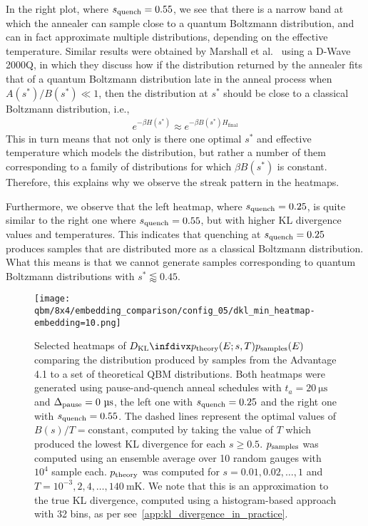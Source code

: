 In the right plot, where \( s_{\text{quench}} = 0.55 \), we see that there is a narrow band at which the annealer can sample close to a quantum Boltzmann distribution, and can in fact approximate multiple distributions, depending on the effective temperature.
Similar results were obtained by Marshall et al.~\cite{marshall_2019} using a D-Wave 2000Q, in which they discuss how if the distribution returned by the annealer fits that of a quantum Boltzmann distribution late in the anneal process when \( A(s^*) / B(s^*) \ll 1 \), then the distribution at \( s^* \) should be close to a classical Boltzmann distribution, i.e.,
\begin{align}
    e^{-\beta H(s^*)} \approx e^{-\beta B(s^*) H_\text{final}}
\end{align}
This in turn means that not only is there one optimal \( s^* \) and effective temperature which models the distribution, but rather a number of them corresponding to a family of distributions for which \( \beta B(s^*) \) is constant.
Therefore, this explains why we observe the streak pattern in the heatmaps.

Furthermore, we observe that the left heatmap, where \( s_{\text{quench}} = 0.25 \), is quite similar to the right one where \( s_{\text{quench}} = 0.55 \), but with higher KL divergence values and temperatures.
This indicates that quenching at \( s_{\text{quench}} = 0.25 \) produces samples that are distributed more as a classical Boltzmann distribution.
What this means is that we cannot generate samples corresponding to quantum Boltzmann distributions with \( s^* \lessapprox 0.45 \).

\begin{figure}[!htb]
    \begin{center}
        \texttt{[image: qbm/8x4/embedding\_comparison/config\_05/dkl\_min\_heatmap-embedding=10.png]}
    \end{center}
    \caption{
        Selected heatmaps of \( \DKL{\ptheory(E;s,T)}{\psamples(E)} \) comparing the distribution produced by samples from the Advantage 4.1 to a set of theoretical QBM distributions.
        Both heatmaps were generated using pause-and-quench anneal schedules with \( t_a = 20 \ \si{\micro\second} \) and \( \Deltapause = 0 \ \si{\micro\second} \), the left one with \( s_{\text{quench}} = 0.25 \) and the right one with \( s_{\text{quench}} = 0.55 \).
        The dashed lines represent the optimal values of \( B(s) / T = \text{constant} \), computed by taking the value of \( T \) which produced the lowest KL divergence for each \( s \ge 0.5 \).
        \( p_{\text{samples}} \) was computed using an ensemble average over 10 random gauges with \( 10^4 \) sample each.
        \( p_{\text{theory}} \) was computed for \( s = 0.01, 0.02, \dots, 1 \) and \( T = 10^{-3}, 2, 4, \dots, 140 \ \si{\milli\kelvin} \).
        We note that this is an approximation to the true KL divergence, computed using a histogram-based approach with 32 bins, as per see~\cref{app:kl_divergence_in_practice}.
    }
    \label{fig:dkl_min_heatmap}
\end{figure}


